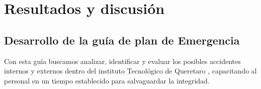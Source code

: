     
    
    
    
    \section{Resultados y discusión}
    
    \subsection{Desarrollo de la guía de plan de Emergencia}
    
    Con esta guía buscamos analizar, identificar y evaluar los posibles accidentes internos y externos dentro del instituto Tecnológico de Queretaro , capacitando al personal en un tiempo establecido para salvaguardar la integridad.
    
